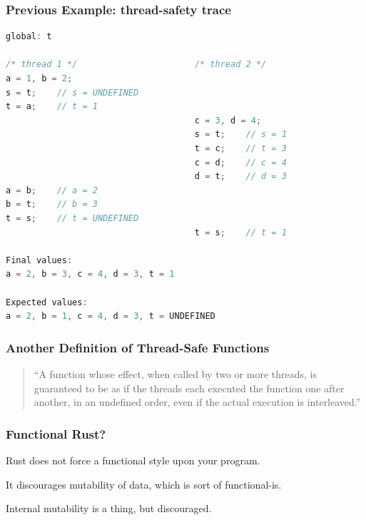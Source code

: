\begin{frame}[fragile]
  \frametitle{Previous Example: thread-safety trace}

  
  \begin{lstlisting}[language=C]
global: t

/* thread 1 */                       /* thread 2 */
a = 1, b = 2;
s = t;    // s = UNDEFINED
t = a;    // t = 1
                                     c = 3, d = 4;
                                     s = t;    // s = 1
                                     t = c;    // t = 3
                                     c = d;    // c = 4
                                     d = t;    // d = 3
a = b;    // a = 2
b = t;    // b = 3
t = s;    // t = UNDEFINED
                                     t = s;    // t = 1

Final values:
a = 2, b = 3, c = 4, d = 3, t = 1

Expected values:
a = 2, b = 1, c = 4, d = 3, t = UNDEFINED
  \end{lstlisting}
  
\end{frame}


\begin{frame}
  \frametitle{Another Definition of Thread-Safe Functions}

  

\begin{quote}
  ``A function whose effect, when called by two or more threads, is guaranteed to
  be as if the threads each executed the function one after another, in an
  undefined order, even if the actual execution is interleaved.''
\end{quote}
  
\end{frame}


\begin{frame}
\frametitle{Functional Rust?}

Rust does not force a functional style upon your program.

It discourages mutability of data, which is sort of functional-is.

Internal mutability is a thing, but discouraged.

\end{frame}







